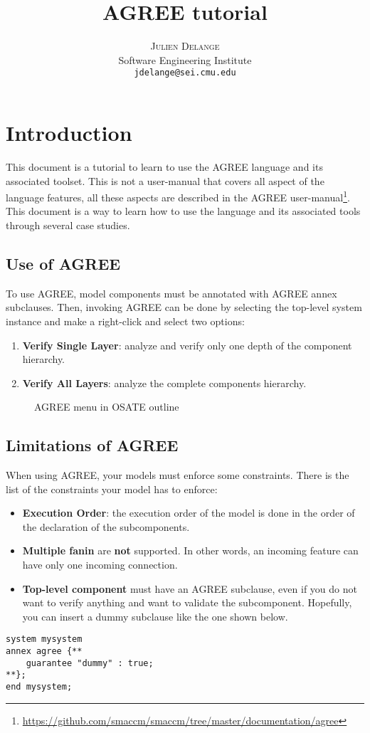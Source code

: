 \documentclass[times, 10pt]{article}
\title{AGREE tutorial}
\author{\textsc{Julien Delange}\\
  Software Engineering Institute\\
  \texttt{jdelange@sei.cmu.edu}
}
\newcommand{\onefullfig}[3]{%
  \begin{figure}[htbp]
    \centerline{\epsfig{file=#1.pdf,width=.7\textwidth}}
    \caption{#2}
    \label{#3}
  \end{figure}
}
\begin{document}
\maketitle

\section{Introduction}
This document is a tutorial to learn to use the AGREE language and its
associated toolset. This is not a user-manual that covers all aspect of the
language features, all these aspects are described in the AGREE 
user-manual\footnote{\url{https://github.com/smaccm/smaccm/tree/master/documentation/agree}}.
This document is a way to learn how to use the language and its associated tools
through several case studies.

    \subsection{Use of AGREE}
    To use AGREE, model components must be annotated with AGREE annex
    subclauses. Then, invoking AGREE can be done by selecting the top-level
    system instance and make a right-click and select two options:
    \begin{enumerate}
        \item
            \textbf{Verify Single Layer}: analyze and verify only one depth
            of the component hierarchy.
        \item
            \textbf{Verify All Layers}: analyze the complete components
            hierarchy.
    \end{enumerate}
\onefullfig{imgs/agree-usage}{AGREE menu in OSATE outline}{fig:agree-usage}

    \subsection{Limitations of AGREE}
    When using AGREE, your models must enforce some constraints. There is the
    list of the constraints your model has to enforce:
    \begin{itemize}
        \item
            \textbf{Execution Order}: the execution order of the model is
            done in the order of the declaration of the subcomponents.
        \item
            \textbf{Multiple fanin} are \textbf{not} supported. In other words,
            an incoming feature can have only one incoming connection.
        \item
            \textbf{Top-level component} must have an AGREE subclause, even
            if you do not want to verify anything and want to validate the
            subcomponent. Hopefully, you can insert a dummy subclause like the
            one shown below.
    \end{itemize}

\begin{lstlisting}
system mysystem
annex agree {**
	guarantee "dummy" : true;
**};
end mysystem;
\end{lstlisting}
\end{document}
